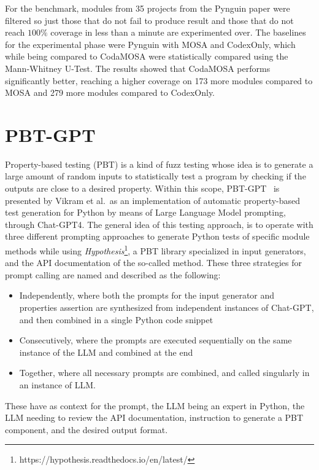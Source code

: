 \documentclass[%
  chapterprefix=false,%
  open=right,%
  twoside=true,%
  paper=a4,%
  logofile={Figures/logo.png},%
  thesistype=master,%
  UKenglish,%
]{se2thesis}
\begin{document}
For the benchmark, modules from 35 projects from the Pynguin paper were filtered so just those that do not fail to produce result and those that do not reach \(100\%\) coverage in less than a minute are experimented over.
The baselines for the experimental phase were Pynguin with MOSA and CodexOnly, which while being compared to CodaMOSA were statistically compared using the Mann-Whitney U-Test.
The results showed that CodaMOSA performs significantly better, reaching a higher coverage on 173 more modules compared to MOSA and 279 more modules compared to CodexOnly.

\section{PBT-GPT}

Property-based testing (PBT) is a kind of fuzz testing whose idea is to generate a large amount of random inputs to statistically test a program by checking if the outputs are close to a desired property.
Within this scope, PBT-GPT~\cite{DBLP:journals/corr/abs-2307-04346} is presented by Vikram et al.\ as an implementation of automatic property-based test generation for Python by means of Large Language Model prompting, through Chat-GPT4.
The general idea of this testing approach, is to operate with three different prompting approaches to generate Python tests of specific module methods while using \textit{Hypothesis}\footnote{https://hypothesis.readthedocs.io/en/latest/}, a PBT library specialized in input generators, and the API documentation of the so-called method.
These three strategies for prompt calling are named and described as the following:

\begin{itemize}
  \item Independently, where both the prompts for the input generator and properties assertion are synthesized from independent instances of Chat-GPT, and then combined in a single Python code snippet
  \item Consecutively, where the prompts are executed sequentially on the same instance of the LLM and combined at the end
  \item Together, where all necessary prompts are combined, and called singularly in an instance of LLM.\@
\end{itemize}

These have as context for the prompt, the LLM being an expert in Python, the LLM needing to review the API documentation, instruction to generate a PBT component, and the desired output format.
\end{document}
